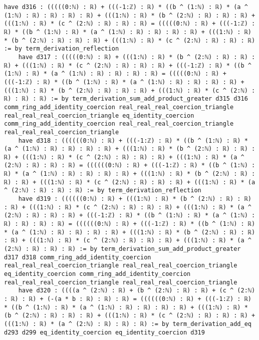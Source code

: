 \documentclass{article}
\begin{document}
\begin{tcolorbox}[colback=white!10, width=\linewidth]
\begin{lstlisting}[language=Lean4]
    have d316 : (((((0:ℕ) : ℝ) + (((-1:ℤ) : ℝ) * ((b ^ (1:ℕ) : ℝ) * (a ^ (1:ℕ) : ℝ) : ℝ) : ℝ) : ℝ) + (((1:ℕ) : ℝ) * (b ^ (2:ℕ) : ℝ) : ℝ) : ℝ) + (((1:ℕ) : ℝ) * (c ^ (2:ℕ) : ℝ) : ℝ) : ℝ) = (((((0:ℕ) : ℝ) + (((-1:ℤ) : ℝ) * ((b ^ (1:ℕ) : ℝ) * (a ^ (1:ℕ) : ℝ) : ℝ) : ℝ) : ℝ) + (((1:ℕ) : ℝ) * (b ^ (2:ℕ) : ℝ) : ℝ) : ℝ) + (((1:ℕ) : ℝ) * (c ^ (2:ℕ) : ℝ) : ℝ) : ℝ) := by term_derivation_reflection
    have d317 : (((((0:ℕ) : ℝ) + (((1:ℕ) : ℝ) * (b ^ (2:ℕ) : ℝ) : ℝ) : ℝ) + (((1:ℕ) : ℝ) * (c ^ (2:ℕ) : ℝ) : ℝ) : ℝ) + (((-1:ℤ) : ℝ) * ((b ^ (1:ℕ) : ℝ) * (a ^ (1:ℕ) : ℝ) : ℝ) : ℝ) : ℝ) = (((((0:ℕ) : ℝ) + (((-1:ℤ) : ℝ) * ((b ^ (1:ℕ) : ℝ) * (a ^ (1:ℕ) : ℝ) : ℝ) : ℝ) : ℝ) + (((1:ℕ) : ℝ) * (b ^ (2:ℕ) : ℝ) : ℝ) : ℝ) + (((1:ℕ) : ℝ) * (c ^ (2:ℕ) : ℝ) : ℝ) : ℝ) := by term_derivation_sum_add_product_greater d315 d316 comm_ring_add_identity_coercion real_real_real_coercion_triangle real_real_real_coercion_triangle eq_identity_coercion comm_ring_add_identity_coercion real_real_real_coercion_triangle real_real_real_coercion_triangle
    have d318 : ((((((0:ℕ) : ℝ) + (((-1:ℤ) : ℝ) * ((b ^ (1:ℕ) : ℝ) * (a ^ (1:ℕ) : ℝ) : ℝ) : ℝ) : ℝ) + (((1:ℕ) : ℝ) * (b ^ (2:ℕ) : ℝ) : ℝ) : ℝ) + (((1:ℕ) : ℝ) * (c ^ (2:ℕ) : ℝ) : ℝ) : ℝ) + (((1:ℕ) : ℝ) * (a ^ (2:ℕ) : ℝ) : ℝ) : ℝ) = ((((((0:ℕ) : ℝ) + (((-1:ℤ) : ℝ) * ((b ^ (1:ℕ) : ℝ) * (a ^ (1:ℕ) : ℝ) : ℝ) : ℝ) : ℝ) + (((1:ℕ) : ℝ) * (b ^ (2:ℕ) : ℝ) : ℝ) : ℝ) + (((1:ℕ) : ℝ) * (c ^ (2:ℕ) : ℝ) : ℝ) : ℝ) + (((1:ℕ) : ℝ) * (a ^ (2:ℕ) : ℝ) : ℝ) : ℝ) := by term_derivation_reflection
    have d319 : ((((((0:ℕ) : ℝ) + (((1:ℕ) : ℝ) * (b ^ (2:ℕ) : ℝ) : ℝ) : ℝ) + (((1:ℕ) : ℝ) * (c ^ (2:ℕ) : ℝ) : ℝ) : ℝ) + (((1:ℕ) : ℝ) * (a ^ (2:ℕ) : ℝ) : ℝ) : ℝ) + (((-1:ℤ) : ℝ) * ((b ^ (1:ℕ) : ℝ) * (a ^ (1:ℕ) : ℝ) : ℝ) : ℝ) : ℝ) = ((((((0:ℕ) : ℝ) + (((-1:ℤ) : ℝ) * ((b ^ (1:ℕ) : ℝ) * (a ^ (1:ℕ) : ℝ) : ℝ) : ℝ) : ℝ) + (((1:ℕ) : ℝ) * (b ^ (2:ℕ) : ℝ) : ℝ) : ℝ) + (((1:ℕ) : ℝ) * (c ^ (2:ℕ) : ℝ) : ℝ) : ℝ) + (((1:ℕ) : ℝ) * (a ^ (2:ℕ) : ℝ) : ℝ) : ℝ) := by term_derivation_sum_add_product_greater d317 d318 comm_ring_add_identity_coercion real_real_real_coercion_triangle real_real_real_coercion_triangle eq_identity_coercion comm_ring_add_identity_coercion real_real_real_coercion_triangle real_real_real_coercion_triangle
    have d320 : ((((a ^ (2:ℕ) : ℝ) + (b ^ (2:ℕ) : ℝ) : ℝ) + (c ^ (2:ℕ) : ℝ) : ℝ) + (-(a * b : ℝ) : ℝ) : ℝ) = ((((((0:ℕ) : ℝ) + (((-1:ℤ) : ℝ) * ((b ^ (1:ℕ) : ℝ) * (a ^ (1:ℕ) : ℝ) : ℝ) : ℝ) : ℝ) + (((1:ℕ) : ℝ) * (b ^ (2:ℕ) : ℝ) : ℝ) : ℝ) + (((1:ℕ) : ℝ) * (c ^ (2:ℕ) : ℝ) : ℝ) : ℝ) + (((1:ℕ) : ℝ) * (a ^ (2:ℕ) : ℝ) : ℝ) : ℝ) := by term_derivation_add_eq d293 d299 eq_identity_coercion eq_identity_coercion d319

\end{lstlisting}
\end{tcolorbox}
\end{document}
